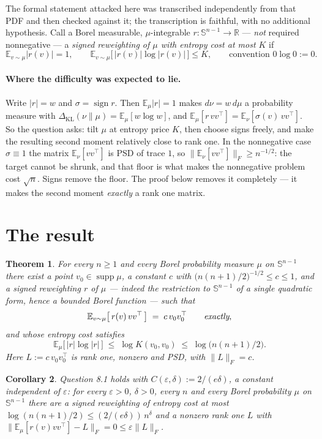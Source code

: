 \documentclass[11pt]{article}
\newtheorem{theorem}{Theorem}
\newtheorem{corollary}[theorem]{Corollary}
\theoremstyle{remark}
\newcommand{\Sph}{\mathbb{S}^{n-1}}
\newcommand{\R}{\mathbb{R}}
\newcommand{\Ex}{\mathbb{E}}
\newcommand{\supp}{\operatorname{supp}}
\begin{document}
The formal statement attacked here was transcribed independently from that PDF and then
checked against it; the transcription is faithful, with no additional hypothesis. Call a
Borel measurable, $\mu$-integrable $r:\Sph\to\R$ --- \emph{not} required nonnegative --- a
\emph{signed reweighting of $\mu$ with entropy cost at most $K$} if
\[
  \Ex_{v\sim\mu}|r(v)| = 1, \qquad
  \Ex_{v\sim\mu}\big[\,|r(v)|\log|r(v)|\,\big] \leq K,
  \qquad\text{convention } 0\log 0 := 0 .
\]

\paragraph{Where the difficulty was expected to lie.} Write $|r|=w$ and $\sigma=\operatorname{sign} r$.
Then $\Ex_\mu|r|=1$ makes $d\nu = w\,d\mu$ a probability measure with
$\Delta_{\mathrm{KL}}(\nu\|\mu)=\Ex_\mu[w\log w]$, and
$\Ex_\mu[r\,vv^{\top}] = \Ex_\nu[\sigma(v)\,vv^{\top}]$. So the question asks: tilt $\mu$ at
entropy price $K$, then choose signs freely, and make the resulting second moment relatively
close to rank one. In the nonnegative case $\sigma\equiv 1$ the matrix $\Ex_\nu[vv^{\top}]$ is
PSD of trace $1$, so $\|\Ex_\nu[vv^{\top}]\|_F \geq n^{-1/2}$: the target cannot be shrunk,
and that floor is what makes the nonnegative problem cost $\sqrt n$. Signs remove the floor.
The proof below removes it completely --- it makes the second moment \emph{exactly} a rank
one matrix.

\section{The result}

\begin{theorem}\label{thm:main}
For every $n\geq 1$ and every Borel probability measure $\mu$ on $\Sph$ there exist a point
$v_0\in\supp\mu$, a constant $c$ with $\big(n(n+1)/2\big)^{-1/2}\leq c\leq 1$, and a signed
reweighting $r$ of $\mu$ --- indeed the restriction to $\Sph$ of a single quadratic form,
hence a bounded Borel function --- such that
\[
  \Ex_{v\sim\mu}\big[\,r(v)\,vv^{\top}\,\big] \;=\; c\,v_0v_0^{\top}
  \qquad\text{\emph{exactly},}
\]
and whose entropy cost satisfies
\[
  \Ex_\mu\big[\,|r|\log|r|\,\big] \;\leq\; \log K(v_0,v_0) \;\leq\; \log\!\big(n(n+1)/2\big).
\]
Here $L := c\,v_0v_0^{\top}$ is rank one, nonzero and PSD, with $\|L\|_F=c$.
\end{theorem}

\begin{corollary}\label{cor:contract}
Question 8.1 holds with $C(\varepsilon,\delta) := 2/(e\delta)$, a constant independent of
$\varepsilon$: for every $\varepsilon>0$, $\delta>0$, every $n$ and every Borel probability
$\mu$ on $\Sph$ there are a signed reweighting of entropy cost at most
$\log(n(n+1)/2) \leq (2/(e\delta))\,n^{\delta}$ and a nonzero rank one $L$ with
$\|\Ex_\mu[r(v)vv^{\top}]-L\|_F = 0 \leq \varepsilon\|L\|_F$.
\end{corollary}
\end{document}
